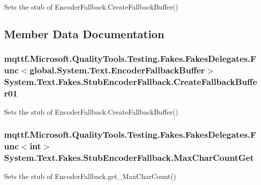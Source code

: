 Sets the stub of Encoder\-Fallback.\-Create\-Fallback\-Buffer()



\subsection{Member Data Documentation}
\hypertarget{class_system_1_1_text_1_1_fakes_1_1_stub_encoder_fallback_a7bc66d7307ed94304cc37225ba046ee9}{
\subsubsection[{Create\-Fallback\-Buffer01}]{\setlength{\rightskip}{0pt plus 5cm}mqttf.\-Microsoft.\-Quality\-Tools.\-Testing.\-Fakes.\-Fakes\-Delegates.\-Func$<$global.\-System.\-Text.\-Encoder\-Fallback\-Buffer$>$ System.\-Text.\-Fakes.\-Stub\-Encoder\-Fallback.\-Create\-Fallback\-Buffer01}}\label{class_system_1_1_text_1_1_fakes_1_1_stub_encoder_fallback_a7bc66d7307ed94304cc37225ba046ee9}


Sets the stub of Encoder\-Fallback.\-Create\-Fallback\-Buffer()

\hypertarget{class_system_1_1_text_1_1_fakes_1_1_stub_encoder_fallback_ad20197b45a9e491422bd10c5ada1df42}{
\subsubsection[{Max\-Char\-Count\-Get}]{\setlength{\rightskip}{0pt plus 5cm}mqttf.\-Microsoft.\-Quality\-Tools.\-Testing.\-Fakes.\-Fakes\-Delegates.\-Func$<$int$>$ System.\-Text.\-Fakes.\-Stub\-Encoder\-Fallback.\-Max\-Char\-Count\-Get}}\label{class_system_1_1_text_1_1_fakes_1_1_stub_encoder_fallback_ad20197b45a9e491422bd10c5ada1df42}


Sets the stub of Encoder\-Fallback.\-get\-\_\-\-Max\-Char\-Count()



